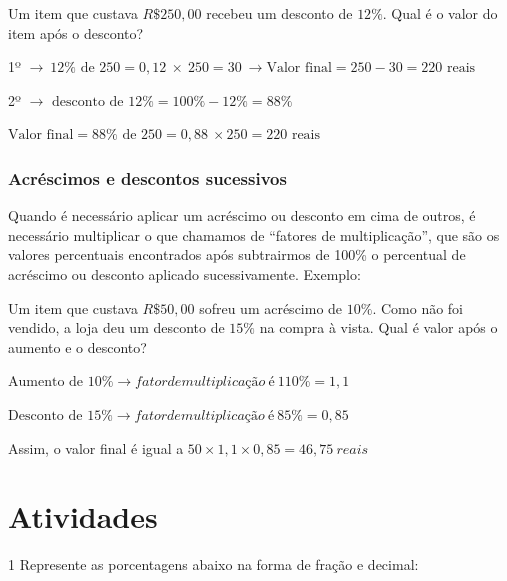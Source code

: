 {\medskip{} 

Um item que custava $R\$250,00$ recebeu um desconto de
$12\%$. Qual é o valor do item após o desconto?\smallskip

1º
$\rightarrow \ 12\% \text{ de } 250 = 0,12\  \times \ 250 = 30\  \rightarrow \text{Valor final} = 250 - 30 = 220 \text{ reais}$

2º
$\rightarrow\text{ desconto de 12}\% = 100\% - 12\% = 88\%$

$\text{Valor final} = 88\% \text{ de } 250 = 0,88\  \times 250 = 220\text{ reais}$

\subsubsection{Acréscimos e descontos sucessivos}

Quando é necessário aplicar um acréscimo ou desconto em cima de outros,
é necessário multiplicar o que chamamos de ``fatores de multiplicação'',
que são os valores percentuais encontrados após subtrairmos de 100\% o
percentual de acréscimo ou desconto aplicado sucessivamente. Exemplo:\medskip

Um item que custava $R\$50,00$ sofreu um acréscimo de
$10\%$. Como não foi vendido, a loja deu um desconto de $15\%$ na compra à
vista. Qual é valor após o aumento e o desconto?

$\text{Aumento de }10\% \rightarrow fator de multiplicação\ é\ 110\% = 1,1$

$\text{Desconto de }15\% \rightarrow fator de multiplicação\ é\ 85\% = 0,85$

Assim, o valor final é igual a
$50 \times 1,1 \times 0,85 = 46,75\ reais$
}


\section*{Atividades}

\num{1} Represente as porcentagens abaixo na forma de fração e decimal:


